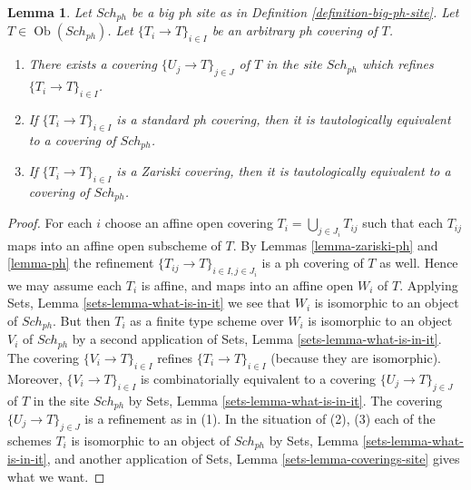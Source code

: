 \documentclass[10pt,a4paper]{amsart}
\theoremstyle{plain}
\newtheorem{lemma}[subsection]{Lemma}
\theoremstyle{definition}
\theoremstyle{remark}
\numberwithin{equation}{subsection}
\def\Sch{\mathit{Sch}}
\def\Ob{\mathop{\mathrm{Ob}}\nolimits}
\begin{document}
\begin{lemma}
\label{lemma-ph-induced}
Let $\Sch_{ph}$ be a big ph site as in
Definition \ref{definition-big-ph-site}.
Let $T \in \Ob(\Sch_{ph})$.
Let $\{T_i \to T\}_{i \in I}$ be an arbitrary ph covering of $T$.
\begin{enumerate}
\item There exists a covering $\{U_j \to T\}_{j \in J}$ of $T$ in the site
$\Sch_{ph}$ which refines $\{T_i \to T\}_{i \in I}$.
\item If $\{T_i \to T\}_{i \in I}$ is a standard ph covering, then
it is tautologically equivalent to a covering of $\Sch_{ph}$.
\item If $\{T_i \to T\}_{i \in I}$ is a Zariski covering, then
it is tautologically equivalent to a covering of $\Sch_{ph}$.
\end{enumerate}
\end{lemma}

\begin{proof}
For each $i$ choose an affine open covering $T_i = \bigcup_{j \in J_i} T_{ij}$
such that each $T_{ij}$ maps into an affine open subscheme of $T$. By
Lemmas \ref{lemma-zariski-ph} and \ref{lemma-ph}
the refinement $\{T_{ij} \to T\}_{i \in I, j \in J_i}$ is a ph covering
of $T$ as well. Hence we may assume each $T_i$ is affine, and maps into
an affine open $W_i$ of $T$. Applying
Sets, Lemma \ref{sets-lemma-what-is-in-it}
we see that $W_i$ is isomorphic to an object of $\Sch_{ph}$.
But then $T_i$ as a finite type scheme over $W_i$
is isomorphic to an object $V_i$ of $\Sch_{ph}$ by a second
application of
Sets, Lemma \ref{sets-lemma-what-is-in-it}.
The covering $\{V_i \to T\}_{i \in I}$ refines $\{T_i \to T\}_{i \in I}$
(because they are isomorphic).
Moreover, $\{V_i \to T\}_{i \in I}$ is combinatorially equivalent to a
covering $\{U_j \to T\}_{j \in J}$ of $T$ in the site
$\Sch_{ph}$ by
Sets, Lemma \ref{sets-lemma-what-is-in-it}.
The covering $\{U_j \to T\}_{j \in J}$ is a refinement as in (1).
In the situation of (2), (3) each of the
schemes $T_i$ is isomorphic to an object of $\Sch_{ph}$ by
Sets, Lemma \ref{sets-lemma-what-is-in-it},
and another application of
Sets, Lemma \ref{sets-lemma-coverings-site}
gives what we want.
\end{proof}
\end{document}
